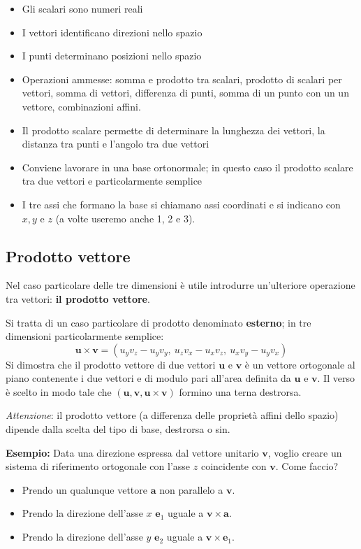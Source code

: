 \documentclass[a4paper, 10pt]{article}
\renewcommand{\vec}{\bm}
\begin{document}
		\begin{itemize}
			\item Gli scalari sono numeri reali
			\item I vettori identificano direzioni nello spazio
			\item I punti determinano posizioni nello spazio
			\item Operazioni ammesse:
			somma e prodotto tra scalari, prodotto di scalari per vettori, somma
			di vettori, differenza di punti, somma di un punto con un un vettore,
			combinazioni affini.
			\item Il prodotto scalare permette di determinare la lunghezza dei
			vettori, la distanza tra punti e l'angolo tra due vettori
			\item Conviene lavorare in una base ortonormale; in questo caso il
			prodotto scalare tra due vettori e particolarmente semplice
			\item I tre assi che formano la base si chiamano assi coordinati e si
			indicano con $ x, y $ e $ z $ (a volte useremo anche 1, 2 e 3).
		\end{itemize}
		
		\subsection{Prodotto vettore}
		Nel caso particolare delle tre dimensioni è utile introdurre
		un'ulteriore operazione tra vettori: \textbf{il prodotto vettore}.
		
		\noindent
		Si tratta di un caso particolare di prodotto denominato
		\textbf{esterno}; in tre dimensioni particolarmente semplice:
		\[
		\vec{u}\times\vec{v} = (u_y v_z - u_y v_y,\: u_z v_x - u_x v_z,\: u_x v_y - u_y v_x)
		\]
		Si dimostra che il prodotto vettore di due vettori $ \vec{u} $ e $ \vec{v} $ è un
		vettore ortogonale al piano contenente i due vettori e di
		modulo pari all'area definita da $ \vec{u} $ e $ \vec{v} $. Il verso è scelto in modo
		tale che $ (\vec{u}, \vec{v}, \vec{u} \times \vec{v}) $ formino una terna destrorsa.
				
		\noindent
		\textit{Attenzione}: il prodotto vettore (a differenza delle proprietà affini
		dello spazio) dipende dalla scelta del tipo di base, destrorsa o sin.
				
		\textbf{Esempio:} Data una direzione espressa dal vettore unitario $ \vec{v} $, voglio
		creare un sistema di riferimento ortogonale con l'asse $ z $
		coincidente con $ \vec{v} $. Come faccio?
		\begin{itemize}
			\item Prendo un qualunque vettore $ \vec{a} $ non parallelo a $ \vec{v} $.
			\item Prendo la direzione dell'asse $ x $ $ \vec{e}_1 $ uguale a $ \vec{v} \times \vec{a} $.
			\item Prendo la direzione dell'asse $ y $ $ \vec{e}_2 $ uguale a $ \vec{v} \times \vec{e}_1 $.
		\end{itemize}
				
\end{document}
